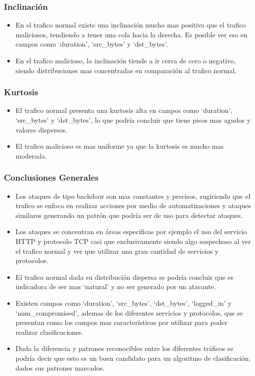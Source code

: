 \documentclass[12pt,a4paper]{article}
\begin{document}
\subsubsection{Inclinación}

\begin{itemize}
  \item En el trafico normal existe una inclinación mucho mas positiva que el trafico maliciosos, tendiendo a tener una cola hacia la derecha.
    Es posible ver eso en campos como `duration', `src_bytes' y `dst_bytes'.
  \item En el trafico malicioso, la inclinación tiende a ir cerca de cero o negativo, siendo distribuciones mas concentradas en comparación al trafico normal.
\end{itemize}

\subsubsection{Kurtosis}

\begin{itemize}
  \item El trafico normal presenta una kurtosis alta en campos como `duration', `src_bytes' y `dst_bytes', lo que podría concluir que tiene picos mas agudos y valores dispersos.
  \item El trafico malicioso es mas uniforme ya que la kurtosis es mucho mas moderada.
\end{itemize}

\subsubsection{Conclusiones Generales}

\begin{itemize}
  \item Los ataques de tipo backdoor son mas constantes y precisos, sugiriendo que el trafico se enfoca en realizar acciones por medio de automatizaciones y ataques similares generando un patrón que podría ser de uso para detectar ataques.
  \item Los ataques se concentran en áreas especificas por ejemplo el uso del servicio HTTP y protocolo TCP casi que exclusivamente siendo algo sospechoso al ver el trafico normal y ver que utilizar una gran cantidad de servicios y protocolos.
  \item El trafico normal dada su distribución dispersa se podría concluir que es indicadora de ser mas `natural' y no ser generado por un atacante.
  \item Existen campos como `duration', `src_bytes', `dst_bytes', `logged_in' y `num_compromised', ademas de los diferentes servicios y protocolos, que se presentan como los campos mas característicos por utilizar para poder realizar clasificaciones.
  \item Dada la diferencia y patrones reconocibles entre los diferentes tráficos se podría decir que esto es un buen candidato para un algoritmo de clasificación, dados sus patrones marcados.
\end{itemize}
\end{document}
